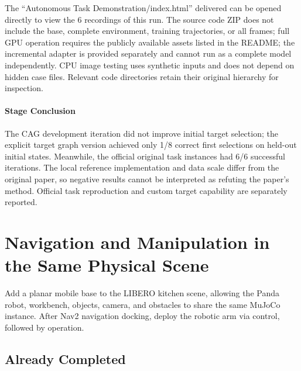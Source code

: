The ``Autonomous Task Demonstration/index.html'' delivered can be opened directly to view the 6 recordings of this run. The source code ZIP does not include the base, complete environment, training trajectories, or all frames; full GPU operation requires the publicly available assets listed in the README; the incremental adapter is provided separately and cannot run as a complete model independently. CPU image testing uses synthetic inputs and does not depend on hidden case files. Relevant code directories retain their original hierarchy for inspection.


\paragraph{Stage Conclusion} The CAG development iteration did not improve initial target selection; the explicit target graph version achieved only 1/8 correct first selections on held-out initial states. Meanwhile, the official original task instances had 6/6 successful iterations. The local reference implementation and data scale differ from the original paper, so negative results cannot be interpreted as refuting the paper's method. Official task reproduction and custom target capability are separately reported.


\FloatBarrier

\section{Navigation and Manipulation in the Same Physical Scene}

\label{stage:s15}

Add a planar mobile base to the LIBERO kitchen scene, allowing the Panda robot, workbench, objects, camera, and obstacles to share the same MuJoCo instance. After Nav2 navigation docking, deploy the robotic arm via control, followed by \pifive{} operation.

\subsection{Already Completed}\label{s15-detail-1}

